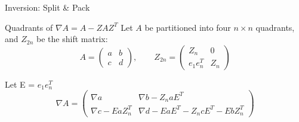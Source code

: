 \begin{frame}{Inversion: Split \& Pack}

  \begin{block}{Quadrants of $\nabla A = A - Z A Z^T$}
    Let $A$ be partitioned into four $n \times n$ quadrants, and
    $Z_{2n}$ be the shift matrix:
    $$A =
    \begin{pmatrix} a & b \\ c & d
    \end{pmatrix}, \qquad Z_{2n} =
    \begin{pmatrix} Z_n & 0 \\ e_1 e_n^T & Z_n
    \end{pmatrix}$$
    \vspace{-0.5em}
  \end{block}

  Let E = $e_1 e_n^T$
  $$
  \nabla A =
  \begin{pmatrix}
    \nabla a & \nabla b - Z_n a E^T \\[1em]
    \nabla c - E a Z_n^T & \nabla d - E a E^T - Z_n c E^T
    - E b Z_n^T
  \end{pmatrix}
  $$

\end{frame}
